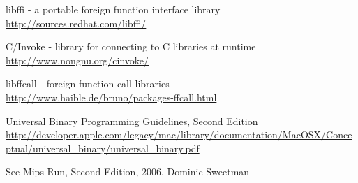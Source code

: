 \begin{thebibliography}{14}
	libffi - a portable foreign function interface library\\
	\url{http://sources.redhat.com/libffi/}

	C/Invoke - library for connecting to C libraries at runtime\\
	\url{http://www.nongnu.org/cinvoke/}

	libffcall - foreign function call libraries\\
	\url{http://www.haible.de/bruno/packages-ffcall.html}

	Universal Binary Programming Guidelines, Second Edition\\
	\url{http://developer.apple.com/legacy/mac/library/documentation/MacOSX/Conceptual/universal\_binary/universal\_binary.pdf}

	See Mips Run, Second Edition, 2006, Dominic Sweetman

\end{thebibliography}

